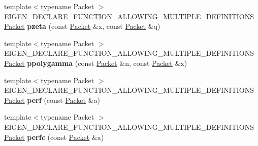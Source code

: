 \begin{DoxyCompactItemize}
\item 
\mbox{\label{namespace_eigen_1_1internal_ad94cae7622231a44fd9d428eb6b39769}} 
{\footnotesize template$<$typename Packet $>$ }\\E\+I\+G\+E\+N\+\_\+\+D\+E\+C\+L\+A\+R\+E\+\_\+\+F\+U\+N\+C\+T\+I\+O\+N\+\_\+\+A\+L\+L\+O\+W\+I\+N\+G\+\_\+\+M\+U\+L\+T\+I\+P\+L\+E\+\_\+\+D\+E\+F\+I\+N\+I\+T\+I\+O\+NS \hyperlink{union_eigen_1_1internal_1_1_packet}{Packet} {\bfseries pzeta} (const \hyperlink{union_eigen_1_1internal_1_1_packet}{Packet} \&x, const \hyperlink{union_eigen_1_1internal_1_1_packet}{Packet} \&q)
\item 
\mbox{\label{namespace_eigen_1_1internal_a54770988f3d8c868accf87d8375942d7}} 
{\footnotesize template$<$typename Packet $>$ }\\E\+I\+G\+E\+N\+\_\+\+D\+E\+C\+L\+A\+R\+E\+\_\+\+F\+U\+N\+C\+T\+I\+O\+N\+\_\+\+A\+L\+L\+O\+W\+I\+N\+G\+\_\+\+M\+U\+L\+T\+I\+P\+L\+E\+\_\+\+D\+E\+F\+I\+N\+I\+T\+I\+O\+NS \hyperlink{union_eigen_1_1internal_1_1_packet}{Packet} {\bfseries ppolygamma} (const \hyperlink{union_eigen_1_1internal_1_1_packet}{Packet} \&n, const \hyperlink{union_eigen_1_1internal_1_1_packet}{Packet} \&x)
\item 
\mbox{\label{namespace_eigen_1_1internal_a3c73a97dc9cd32dc16adedfcad53cd6e}} 
{\footnotesize template$<$typename Packet $>$ }\\E\+I\+G\+E\+N\+\_\+\+D\+E\+C\+L\+A\+R\+E\+\_\+\+F\+U\+N\+C\+T\+I\+O\+N\+\_\+\+A\+L\+L\+O\+W\+I\+N\+G\+\_\+\+M\+U\+L\+T\+I\+P\+L\+E\+\_\+\+D\+E\+F\+I\+N\+I\+T\+I\+O\+NS \hyperlink{union_eigen_1_1internal_1_1_packet}{Packet} {\bfseries perf} (const \hyperlink{union_eigen_1_1internal_1_1_packet}{Packet} \&a)
\item 
\mbox{\label{namespace_eigen_1_1internal_a5572c4ffb6c907fa82dbfd3eb8e5d04c}} 
{\footnotesize template$<$typename Packet $>$ }\\E\+I\+G\+E\+N\+\_\+\+D\+E\+C\+L\+A\+R\+E\+\_\+\+F\+U\+N\+C\+T\+I\+O\+N\+\_\+\+A\+L\+L\+O\+W\+I\+N\+G\+\_\+\+M\+U\+L\+T\+I\+P\+L\+E\+\_\+\+D\+E\+F\+I\+N\+I\+T\+I\+O\+NS \hyperlink{union_eigen_1_1internal_1_1_packet}{Packet} {\bfseries perfc} (const \hyperlink{union_eigen_1_1internal_1_1_packet}{Packet} \&a)
\item 
\mbox{\label{namespace_eigen_1_1internal_ac3d929cd25adae6c265b5cdc4c900466}} 

\end{DoxyCompactItemize}
